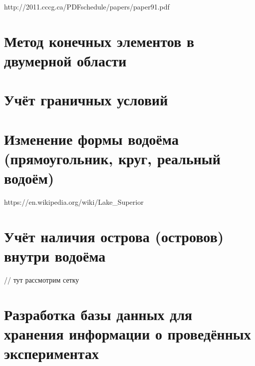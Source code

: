 \documentclass[14pt]{extreport}
\begin{document}
http://2011.cccg.ca/PDFschedule/papers/paper91.pdf





\chapter{Метод конечных элементов в двумерной области}









\chapter{Учёт граничных условий}


\chapter{Изменение формы водоёма (прямоугольник, круг, реальный водоём)}

https://en.wikipedia.org/wiki/Lake_Superior

\chapter{Учёт наличия острова (островов) внутри водоёма}

// тут рассмотрим сетку


\chapter{Разработка базы данных для хранения информации о проведённых экспериментах}




\end{document}
